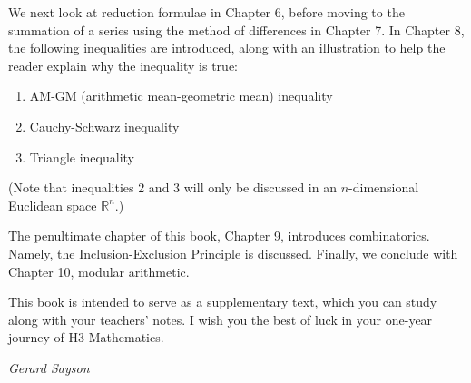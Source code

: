 \begin{preface}
    We next look at reduction formulae in Chapter 6, before moving to the summation of a series using
    the method of differences in Chapter 7. In Chapter 8, the following inequalities are introduced,
    along with an illustration to help the reader explain why the inequality is true:
    \begin{enumerate}
        \item AM-GM (arithmetic mean-geometric mean) inequality
        \item Cauchy-Schwarz inequality
        \item Triangle inequality
    \end{enumerate}
    (Note that inequalities 2 and 3 will only be discussed in an $n$-dimensional Euclidean space $\mathbb{R}^n$.)

    The penultimate chapter of this book, Chapter 9, introduces combinatorics. Namely, the Inclusion-Exclusion Principle
    is discussed. Finally, we conclude with Chapter 10, modular arithmetic.

    This book is intended to serve as a supplementary text, which you can study along with your teachers' notes.
    I wish you the best of luck in your one-year journey of H3 Mathematics.

    \begin{flushright}
        \textit{Gerard Sayson}
    \end{flushright}
\end{preface}